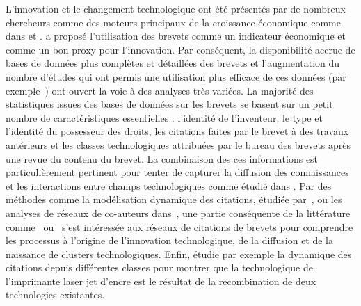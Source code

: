 {L'innovation et le changement technologique ont été présentés par de nombreux chercheurs comme des moteurs principaux de la croissance économique comme dans \cite{aghionhowitt1992} et \cite{romer1990}. \cite{RePEc:nbr:nberwo:3301} a proposé l'utilisation des brevets comme un indicateur économique et comme un bon proxy pour l'innovation. Par conséquent, la disponibilité accrue de bases de données plus complètes et détaillées des brevets et l'augmentation du nombre d'études qui ont permis une utilisation plus efficace de ces données (par exemple~\cite{Hall2001}) ont ouvert la voie à des analyses très variées. La majorité des statistiques issues des bases de données sur les brevets se basent sur un petit nombre de caractéristiques essentielles : l'identité de l'inventeur, le type et l'identité du possesseur des droits, les citations faites par le brevet à des travaux antérieurs et les classes technologiques attribuées par le bureau des brevets après une revue du contenu du brevet. La combinaison des ces informations est particulièrement pertinent pour tenter de capturer la diffusion des connaissances et les interactions entre champs technologiques comme étudié dans \cite{Youn:2015fk}. Par des méthodes comme la modélisation dynamique des citations, étudiée par~\cite{2013arXiv1310.8220N}, ou les analyses de réseaux de co-auteurs dans~\cite{2014arXiv1402.7268S}, une partie conséquente de la littérature comme~\cite{sorenson2006complexity} ou~\cite{kay2014patent} s'est intéressée aux réseaux de citations de brevets pour comprendre les processus à l'origine de l'innovation technologique, de la diffusion et de la naissance de clusters technologiques. Enfin, \cite{bruck2016recognition} étudie par exemple la dynamique des citations depuis différentes classes pour montrer que la technologique de l'imprimante laser jet d'encre est le résultat de la recombination de deux technologies existantes.
}



